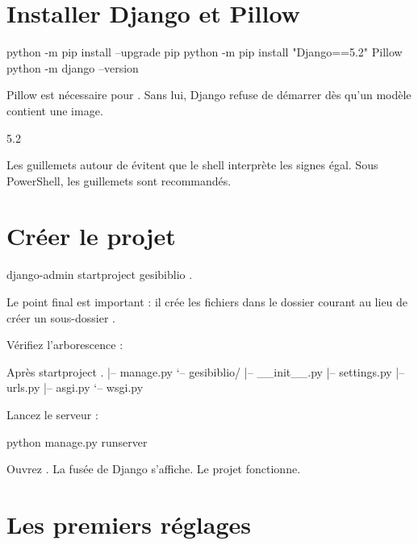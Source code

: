 \section{Installer Django et Pillow}

\begin{terminal}
python -m pip install --upgrade pip
python -m pip install "Django==5.2" Pillow
python -m django --version
\end{terminal}

Pillow est nécessaire pour . Sans lui, Django refuse de démarrer
dès qu'un modèle contient une image.

\begin{terminal}
5.2
\end{terminal}

\begin{note}
Les guillemets autour de  évitent que le shell interprète les
signes égal. Sous PowerShell, les guillemets sont recommandés.
\end{note}

\section{Créer le projet}

\begin{terminal}
django-admin startproject gesibiblio .
\end{terminal}

Le point final est important : il crée les fichiers dans le dossier courant au lieu
de créer un sous-dossier .

Vérifiez l'arborescence :

\begin{codebox}[tree]{Après startproject}
.
|-- manage.py
`-- gesibiblio/
    |-- __init__.py
    |-- settings.py
    |-- urls.py
    |-- asgi.py
    `-- wsgi.py
\end{codebox}

Lancez le serveur :

\begin{terminal}
python manage.py runserver
\end{terminal}

Ouvrez . La fusée de Django s'affiche. Le projet
fonctionne.

\section{Les premiers réglages}

